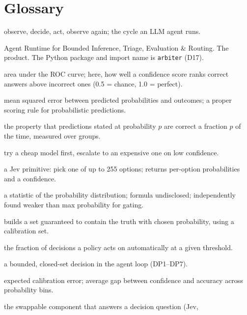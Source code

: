 \chapter{Glossary}
\label{app:glossary}

\begin{description}[style=nextline,leftmargin=0.6cm]
  \item[Agent loop] observe, decide, act, observe again; the cycle an LLM
    agent runs.
  \item[ARBITER] Agent Runtime for Bounded Inference, Triage, Evaluation \&
    Routing. The product. The Python package and import name is \texttt{arbiter} (D17).
  \item[AUROC] area under the ROC curve; here, how well a confidence score ranks
    correct answers above incorrect ones (0.5 = chance, 1.0 = perfect).
  \item[Brier score] mean squared error between predicted probabilities
    and outcomes; a proper scoring rule for probabilistic predictions.
  \item[Calibration] the property that predictions stated at probability
    $p$ are correct a fraction $p$ of the time, measured over groups.
  \item[Cascade] try a cheap model first, escalate to an expensive one on low
    confidence.
  \item[Choice] a Jev primitive: pick one of up to 255 options; returns
    per-option probabilities and a confidence.
  \item[Confidence (Jev field)] a statistic of the probability
    distribution; formula undisclosed; independently found weaker than max probability for
    gating.
  \item[Conformal prediction] builds a set guaranteed to contain
    the truth with chosen probability, using a calibration set.
  \item[Coverage] the fraction of decisions a policy acts on automatically at
    a given threshold.
  \item[Decision point (DP)] a bounded, closed-set decision in the
    agent loop (DP1--DP7).
  \item[ECE] expected calibration error; average gap between confidence and
    accuracy across probability bins.
  \item[Engine] the swappable component that answers a decision question (Jev,

\end{description}

